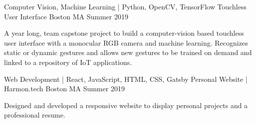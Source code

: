 

\begin{cventries}
  \cventry
    {Computer Vision, Machine Learning | Python, OpenCV, TensorFlow} %
    {Touchless User Interface} %
    {Boston MA} %
    {Summer 2019} %
    {
      \begin{cvitems} %
        \item {A year long, team capstone project to build a computer-vision based touchless user interface with a monocular RGB camera and machine learning. Recognizes static or dynamic gestures and allows new gestures to be trained on demand and linked to a repository of IoT applications.}
      \end{cvitems}
    }

  \cventry
    {Web Development | React, JavaScript, HTML, CSS, Gatsby} %
    {Personal Website | Harmon.tech} %
    {Boston MA} %
    {Summer 2019} %
    {
      \begin{cvitems} %
        \item {Designed and developed a responsive website to display personal projects and a professional resume.}
      \end{cvitems}
    }


\end{cventries}
